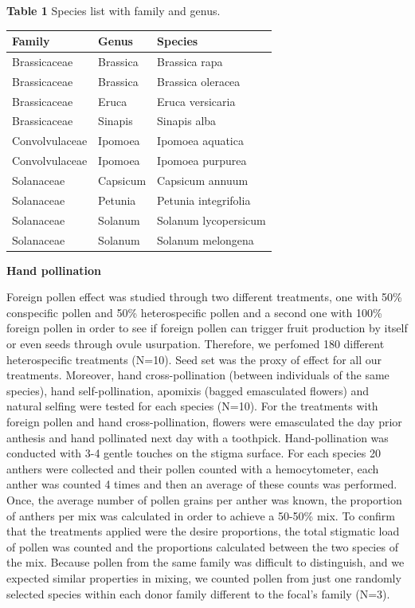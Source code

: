 \documentclass[11pt,a4paper]{article}
\begin{document}
\newpage

\textbf{Table 1} Species list with family and genus.

\begin{longtable}[]{@{}lll@{}}
\toprule
Family & Genus & Species\tabularnewline
\midrule
\endhead
Brassicaceae & Brassica & Brassica rapa\tabularnewline
Brassicaceae & Brassica & Brassica oleracea\tabularnewline
Brassicaceae & Eruca & Eruca versicaria\tabularnewline
Brassicaceae & Sinapis & Sinapis alba\tabularnewline
Convolvulaceae & Ipomoea & Ipomoea aquatica\tabularnewline
Convolvulaceae & Ipomoea & Ipomoea purpurea\tabularnewline
Solanaceae & Capsicum & Capsicum annuum\tabularnewline
Solanaceae & Petunia & Petunia integrifolia\tabularnewline
Solanaceae & Solanum & Solanum lycopersicum\tabularnewline
Solanaceae & Solanum & Solanum melongena\tabularnewline
\bottomrule
\end{longtable}

\newpage

\textbf{Hand pollination}

Foreign pollen effect was studied through two different treatments, one
with 50\% conspecific pollen and 50\% heterospecific pollen and a second
one with 100\% foreign pollen in order to see if foreign pollen can
trigger fruit production by itself or even seeds through ovule
usurpation. Therefore, we perfomed 180 different heterospecific
treatments (N=10). Seed set was the proxy of effect for all our
treatments. Moreover, hand cross-pollination (between individuals of the
same species), hand self-pollination, apomixis (bagged emasculated
flowers) and natural selfing were tested for each species (N=10). For
the treatments with foreign pollen and hand cross-pollination, flowers
were emasculated the day prior anthesis and hand pollinated next day
with a toothpick. Hand-pollination was conducted with 3-4 gentle touches
on the stigma surface. For each species 20 anthers were collected and
their pollen counted with a hemocytometer, each anther was counted 4
times and then an average of these counts was performed. Once, the
average number of pollen grains per anther was known, the proportion of
anthers per mix was calculated in order to achieve a 50-50\% mix. To
confirm that the treatments applied were the desire proportions, the
total stigmatic load of pollen was counted and the proportions
calculated between the two species of the mix. Because pollen from the
same family was difficult to distinguish, and we expected similar
properties in mixing, we counted pollen from just one randomly selected
species within each donor family different to the focal's family (N=3).
\end{document}
